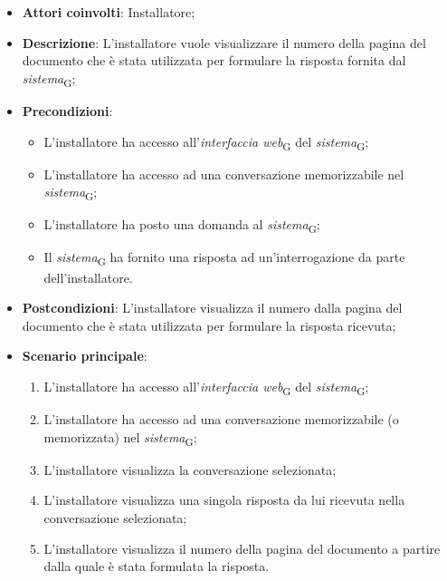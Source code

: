 \begin{itemize}
    \item \textbf{Attori coinvolti}: Installatore;
    \item \textbf{Descrizione}: L'installatore vuole visualizzare il numero della pagina del documento che è stata utilizzata per formulare la risposta fornita dal \textit{sistema}\textsubscript{G};
    \item \textbf{Precondizioni}: 
    \begin{itemize}
        \item L’installatore ha accesso all’\textit{interfaccia web}\textsubscript{G} del \textit{sistema}\textsubscript{G};
        \item L’installatore ha accesso ad una conversazione memorizzabile nel \textit{sistema}\textsubscript{G};
        \item L'installatore ha posto una domanda al \textit{sistema}\textsubscript{G};
        \item Il \textit{sistema}\textsubscript{G} ha fornito una risposta ad un’interrogazione da parte dell’installatore.
    \end{itemize}
    \item \textbf{Postcondizioni}: L'installatore visualizza il numero dalla pagina del documento che è stata utilizzata per formulare la risposta ricevuta;
    \item \textbf{Scenario principale}:
    \begin{enumerate}
        \item L’installatore ha accesso all’\textit{interfaccia web}\textsubscript{G} del \textit{sistema}\textsubscript{G};
        \item L’installatore ha accesso ad una conversazione memorizzabile (o memorizzata) nel \textit{sistema}\textsubscript{G};
        \item L'installatore visualizza la conversazione selezionata;
        \item L'installatore visualizza una singola risposta da lui ricevuta nella conversazione selezionata;
        \item L'installatore visualizza il numero della pagina del documento a partire dalla quale è stata formulata la risposta.
    \end{enumerate}
\end{itemize}

